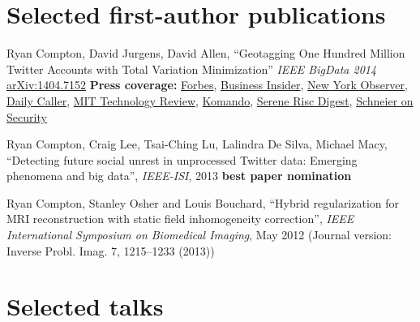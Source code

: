 \documentclass[margin,line]{res}
\begin{document}
\begin{resume}
\section{\sc Selected first-author publications}

Ryan Compton, David Jurgens, David Allen, ``Geotagging One Hundred Million Twitter Accounts with Total Variation Minimization'' {\it IEEE BigData 2014} \href{https://arxiv.org/abs/1404.7152}{arXiv:1404.7152} {\bf Press coverage:} \href{https://www.forbes.com/sites/thomasbrewster/2015/03/07/twitter-location-can-be-determined-through-friends/}{Forbes}, \href{https://www.businessinsider.com/twitter-location-research-at-mentions-cornell-2015-3}{Business Insider}, \href{https://observer.com/2015/03/you-dont-have-to-geotag-your-tweets-to-give-away-your-location/}{New York Observer}, \href{https://dailycaller.com/2015/03/06/how-your-tweets-can-reveal-your-real-location/}{Daily Caller}, \href{https://web.archive.org/web/20160125192226/http://www.technologyreview.com/view/527246/other-interesting-arxiv-papers-week-ending-may-10-2014/}{MIT Technology Review}, \href{https://web.archive.org/web/20161224071216/http://www.komando.com/happening-now/299085/forget-gps-hackers-can-pinpoint-your-exact-location-using-social-media/all}{Komando}, \href{https://ryancompton.net/assets/resume/Serene_Risc_Digest_2015_Spring.pdf}{Serene Risc Digest}, \href{https://www.schneier.com/blog/archives/2015/03/geotagging_twit.html}{Schneier on Security}

Ryan Compton, Craig Lee, Tsai-Ching Lu, Lalindra De Silva, Michael Macy, ``Detecting future social unrest in unprocessed Twitter data: Emerging phenomena and big data'', {\it IEEE-ISI}, 2013 {\bf best paper nomination}

Ryan Compton, Stanley Osher and Louis Bouchard, ``Hybrid regularization for MRI reconstruction with static field inhomogeneity correction'', {\it IEEE International Symposium on Biomedical Imaging}, May 2012 (Journal version: Inverse Probl. Imag. 7, 1215--1233 (2013))

\section{\sc Selected talks}


\end{resume}
\end{document}

